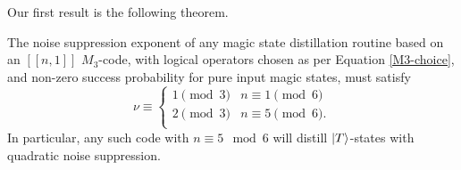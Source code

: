 \documentclass[11pt]{article}
\def\ket#1{\mathinner{|{#1}\rangle}}
\begin{document}
Our first result is the following theorem. 
\begin{theorem}
The noise suppression exponent of any magic state distillation routine based on an $[[n,1]]$ $M_3$-code, with logical operators chosen as per Equation \eqref{M3-choice}, and non-zero success probability for pure input magic states, must satisfy
\begin{equation}
\nu \equiv \begin{cases} 1 \pmod 3  &  n \equiv 1 \pmod 6 \\
2 \pmod 3   &  n \equiv 5 \pmod 6. \\
\end{cases}
\end{equation}
In particular, any such code with $n \equiv 5 \mod 6$ will distill $\ket{T}$-states with quadratic noise suppression. 
\label{theorem-mod-3}
\end{theorem}
\end{document}
